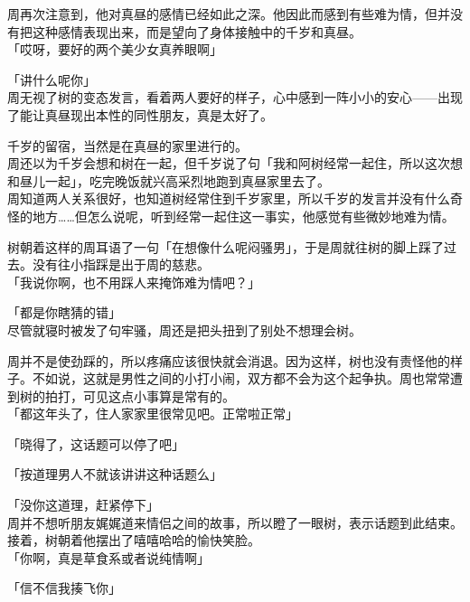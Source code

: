 周再次注意到，他对真昼的感情已经如此之深。他因此而感到有些难为情，但并没有把这种感情表现出来，而是望向了身体接触中的千岁和真昼。\\

「哎呀，要好的两个美少女真养眼啊」

「讲什么呢你」\\

周无视了树的变态发言，看着两人要好的样子，心中感到一阵小小的安心——出现了能让真昼现出本性的同性朋友，真是太好了。\\

\vspace{2\baselineskip}

千岁的留宿，当然是在真昼的家里进行的。\\

周还以为千岁会想和树在一起，但千岁说了句「我和阿树经常一起住，所以这次想和昼儿一起」，吃完晚饭就兴高采烈地跑到真昼家里去了。\\

周知道两人关系很好，也知道树经常住到千岁家里，所以千岁的发言并没有什么奇怪的地方……但怎么说呢，听到经常一起住这一事实，他感觉有些微妙地难为情。

树朝着这样的周耳语了一句「在想像什么呢闷骚男」，于是周就往树的脚上踩了过去。没有往小指踩是出于周的慈悲。\\

「我说你啊，也不用踩人来掩饰难为情吧？」

「都是你瞎猜的错」\\

尽管就寝时被发了句牢骚，周还是把头扭到了别处不想理会树。

周并不是使劲踩的，所以疼痛应该很快就会消退。因为这样，树也没有责怪他的样子。不如说，这就是男性之间的小打小闹，双方都不会为这个起争执。周也常常遭到树的拍打，可见这点小事算是常有的。\\

「都这年头了，住人家家里很常见吧。正常啦正常」

「晓得了，这话题可以停了吧」

「按道理男人不就该讲讲这种话题么」

「没你这道理，赶紧停下」\\

周并不想听朋友娓娓道来情侣之间的故事，所以瞪了一眼树，表示话题到此结束。接着，树朝着他摆出了嘻嘻哈哈的愉快笑脸。\\

「你啊，真是草食系或者说纯情啊」

「信不信我揍飞你」

